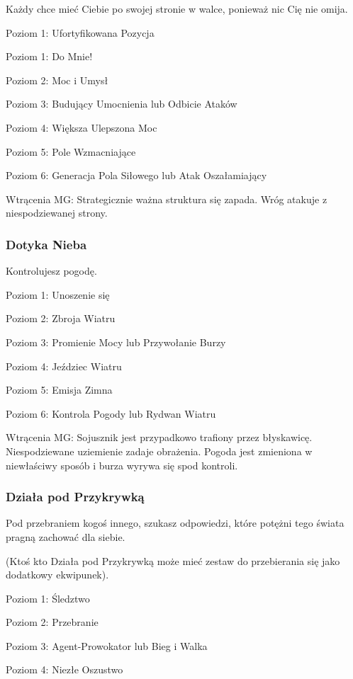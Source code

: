Każdy chce mieć Ciebie po swojej stronie w walce, ponieważ nic Cię nie omija.

Poziom 1: Ufortyfikowana Pozycja

Poziom 1: Do Mnie!

Poziom 2: Moc i Umysł

Poziom 3: Budujący Umocnienia lub Odbicie Ataków

Poziom 4: Większa Ulepszona Moc

Poziom 5: Pole Wzmacniające

Poziom 6: Generacja Pola Siłowego lub Atak Oszałamiający

Wtrącenia MG: Strategicznie ważna struktura się zapada. Wróg atakuje z niespodziewanej strony.

\subsubsection{Dotyka Nieba}

Kontrolujesz pogodę.

Poziom 1: Unoszenie się

Poziom 2: Zbroja Wiatru

Poziom 3: Promienie Mocy lub Przywołanie Burzy

Poziom 4: Jeździec Wiatru

Poziom 5: Emisja Zimna

Poziom 6: Kontrola Pogody lub Rydwan Wiatru

Wtrącenia MG: Sojusznik jest przypadkowo trafiony przez błyskawicę. Niespodziewane uziemienie zadaje obrażenia. Pogoda jest zmieniona w niewłaściwy sposób i burza wyrywa się spod kontroli. 

\subsubsection{Działa pod Przykrywką}

Pod przebraniem kogoś innego, szukasz odpowiedzi, które potężni tego świata pragną zachować dla siebie. 

(Ktoś kto Działa pod Przykrywką może mieć zestaw do przebierania się jako dodatkowy ekwipunek).

Poziom 1: Śledztwo

Poziom 2: Przebranie

Poziom 3: Agent-Prowokator lub Bieg i Walka

Poziom 4: Niezłe Oszustwo

